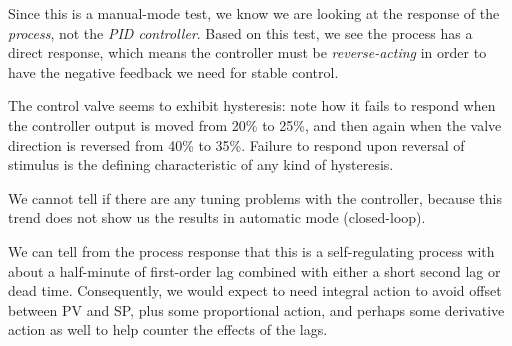 \vskip 10pt

Since this is a manual-mode test, we know we are looking at the response of the {\it process}, not the {\it PID controller}.  Based on this test, we see the process has a direct response, which means the controller must be {\it reverse-acting} in order to have the negative feedback we need for stable control.

\vskip 10pt

The control valve seems to exhibit hysteresis: note how it fails to respond when the controller output is moved from 20\% to 25\%, and then again when the valve direction is reversed from 40\% to 35\%.  Failure to respond upon reversal of stimulus is the defining characteristic of any kind of hysteresis.

\vskip 10pt

We cannot tell if there are any tuning problems with the controller, because this trend does not show us the results in automatic mode (closed-loop).

\vskip 10pt

We can tell from the process response that this is a self-regulating process with about a half-minute of first-order lag combined with either a short second lag or dead time.  Consequently, we would expect to need integral action to avoid offset between PV and SP, plus some proportional action, and perhaps some derivative action as well to help counter the effects of the lags.





